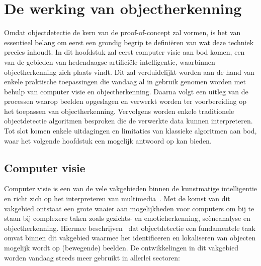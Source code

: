 \section{De werking van objectherkenning}\label{sec:ls-object-detectie}
Omdat objectdetectie de kern van de proof-of-concept zal vormen, is het van essentieel belang om eerst een grondig begrip te defini\"eren van wat deze techniek precies inhoudt.
In dit hoofdstuk zal eerst computer visie aan bod komen, een van de gebieden van hedendaagse artifici\"ele intelligentie, waarbinnen objectherkenning zich plaats vindt.
Dit zal verduidelijkt worden aan de hand van enkele praktische toepassingen die vandaag al in gebruik genomen worden met behulp van computer visie en objectherkenning.
Daarna volgt een uitleg van de processen waarop beelden opgeslagen en verwerkt worden ter voorbereiding op het toepassen van objectherkenning.
Vervolgens worden enkele traditionele objectdetectie algoritmen besproken die de verwerkte data kunnen interpreteren.
Tot slot komen enkele uitdagingen en limitaties van klassieke algoritmen aan bod, waar het volgende hoofdstuk een mogelijk antwoord op kan bieden.

\subsection{Computer visie}\label{subsec:de-kern-van-objectdetectie}
Computer visie is een van de vele vakgebieden binnen de kunstmatige intelligentie en richt zich op het interpreteren van multimedia~\autocite{Moin2023}.
Met de komst van dit vakgebied ontstaat een grote waaier aan mogelijkheden voor computers om bij te staan bij complexere taken zoals gezichts- en emotieherkenning, sc\`eneanalyse en objectherkenning.
Hiermee beschrijven~\textcite{Tasnim2023} dat objectdetectie een fundamentele taak omvat binnen dit vakgebied waarmee het identificeren en lokaliseren van objecten mogelijk wordt op (bewegende) beelden.
De ontwikkelingen in dit vakgebied worden vandaag steeds meer gebruikt in allerlei sectoren:


